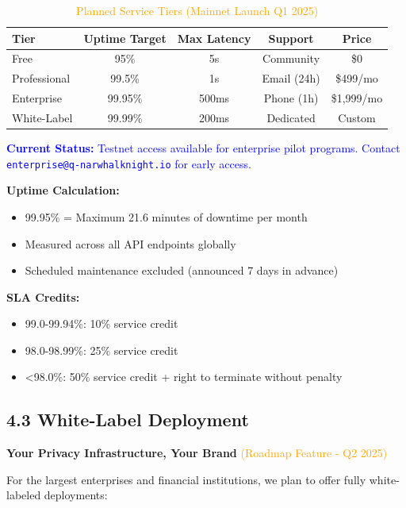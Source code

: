 \documentclass[11pt,a4paper]{article}
\begin{document}
\begin{table}[h]
\centering
\caption{\textcolor{orange}{Planned Service Tiers (Mainnet Launch Q1 2025)}}
\begin{tabular}{lcccc}
\toprule
\textbf{Tier} & \textbf{Uptime Target} & \textbf{Max Latency} & \textbf{Support} & \textbf{Price} \\
\midrule
Free & 95\% & 5s & Community & \$0 \\
Professional & 99.5\% & 1s & Email (24h) & \$499/mo \\
Enterprise & 99.95\% & 500ms & Phone (1h) & \$1,999/mo \\
White-Label & 99.99\% & 200ms & Dedicated & Custom \\
\bottomrule
\end{tabular}
\end{table}

\textcolor{blue}{\textbf{Current Status:} Testnet access available for enterprise pilot programs. Contact \texttt{enterprise@q-narwhalknight.io} for early access.}

\textbf{Uptime Calculation:}
\begin{itemize}
    \item 99.95\% = Maximum 21.6 minutes of downtime per month
    \item Measured across all API endpoints globally
    \item Scheduled maintenance excluded (announced 7 days in advance)
\end{itemize}

\textbf{SLA Credits:}
\begin{itemize}
    \item 99.0-99.94\%: 10\% service credit
    \item 98.0-98.99\%: 25\% service credit
    \item <98.0\%: 50\% service credit + right to terminate without penalty
\end{itemize}

\subsection{4.3 White-Label Deployment}

\textbf{Your Privacy Infrastructure, Your Brand} \textcolor{orange}{(Roadmap Feature - Q2 2025)}

For the largest enterprises and financial institutions, we plan to offer fully white-labeled deployments:
\end{document}
